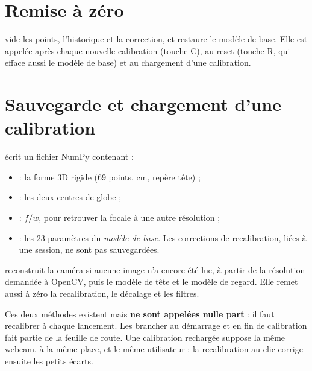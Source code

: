\section{Remise à zéro}

 vide les points, l'historique et la correction, et restaure le modèle de base. Elle est appelée après chaque nouvelle calibration (touche C), au reset (touche R, qui efface aussi le modèle de base) et au chargement d'une calibration.

\section{Sauvegarde et chargement d'une calibration}

 écrit un fichier  NumPy contenant :
\begin{itemize}
  \item {} : la forme 3D rigide (69 points, cm, repère tête) ;
  \item {} : les deux centres de globe ;
  \item {} : $f/w$, pour retrouver la focale à une autre résolution ;
  \item {} : les 23 paramètres du \emph{modèle de base}. Les corrections de recalibration, liées à une session, ne sont pas sauvegardées.
\end{itemize}

 reconstruit la caméra si aucune image n'a encore été lue, à partir de la résolution demandée à OpenCV, puis le modèle de tête et le modèle de regard. Elle remet aussi à zéro la recalibration, le décalage et les filtres.

\begin{attention}
Ces deux méthodes existent mais \textbf{ne sont appelées nulle part} : il faut recalibrer à chaque lancement. Les brancher au démarrage et en fin de calibration fait partie de la feuille de route. Une calibration rechargée suppose la même webcam, à la même place, et le même utilisateur ; la recalibration au clic corrige ensuite les petits écarts.
\end{attention}
